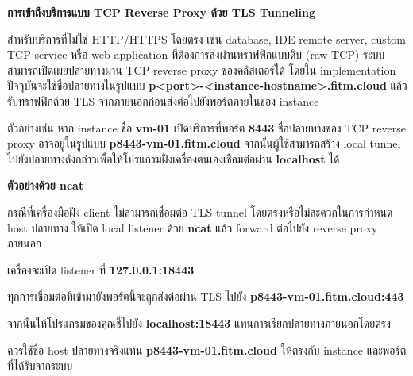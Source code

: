 \vspace{0.5em}
\textbf{การเข้าถึงบริการแบบ TCP Reverse Proxy ด้วย TLS Tunneling}
\vspace{0.5em}

\hspace*{1.3em}
สำหรับบริการที่ไม่ใช่ HTTP/HTTPS โดยตรง เช่น database, IDE remote server, custom TCP service หรือ web application ที่ต้องการส่งผ่านทราฟฟิกแบบดิบ (raw TCP) ระบบสามารถเปิดเผยปลายทางผ่าน TCP reverse proxy ของคลัสเตอร์ได้ โดยใน implementation ปัจจุบันจะใช้ชื่อปลายทางในรูปแบบ \textbf{p\textless port\textgreater-\textless instance-hostname\textgreater.fitm.cloud} แล้วรับทราฟฟิกด้วย TLS จากภายนอกก่อนส่งต่อไปยังพอร์ตภายในของ instance

\hspace*{1.3em}
ตัวอย่างเช่น หาก instance ชื่อ \textbf{vm-01} เปิดบริการที่พอร์ต \textbf{8443} ชื่อปลายทางของ TCP reverse proxy อาจอยู่ในรูปแบบ \textbf{p8443-vm-01.fitm.cloud} จากนั้นผู้ใช้สามารถสร้าง local tunnel ไปยังปลายทางดังกล่าวเพื่อให้โปรแกรมฝั่งเครื่องตนเองเชื่อมต่อผ่าน \textbf{localhost} ได้

\vspace{0.5em}
\textbf{ตัวอย่างด้วย ncat}
\vspace{0.5em}

\hspace*{1.3em}
กรณีที่เครื่องมือฝั่ง client ไม่สามารถเชื่อมต่อ TLS tunnel โดยตรงหรือไม่สะดวกในการกำหนด host ปลายทาง ให้เปิด local listener ด้วย \textbf{ncat} แล้ว forward ต่อไปยัง reverse proxy ภายนอก

\begin{figure}[H]
\centering
{}
\caption{}
\label{figI:TcpTunnelNcat}
\end{figure}

\begin{mycustomenum2}
    \item เครื่องจะเปิด listener ที่ \textbf{127.0.0.1:18443}
    \item ทุกการเชื่อมต่อที่เข้ามายังพอร์ตนี้จะถูกส่งต่อผ่าน TLS ไปยัง \textbf{p8443-vm-01.fitm.cloud:443}
    \item จากนั้นให้โปรแกรมของคุณชี้ไปยัง \textbf{localhost:18443} แทนการเรียกปลายทางภายนอกโดยตรง
    \item ควรใช้ชื่อ host ปลายทางจริงแทน \textbf{p8443-vm-01.fitm.cloud} ให้ตรงกับ instance และพอร์ตที่ได้รับจากระบบ
\end{mycustomenum2}

